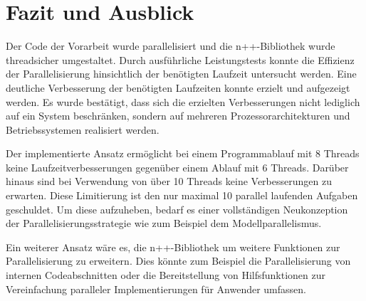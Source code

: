 \chapter{Fazit und Ausblick}
\label{ch:Zusammenfassung}

Der Code der Vorarbeit wurde parallelisiert und die n++-Bibliothek wurde threadsicher umgestaltet. Durch ausführliche Leistungstests konnte die Effizienz der Parallelisierung hinsichtlich der benötigten Laufzeit untersucht werden. Eine deutliche Verbesserung der benötigten Laufzeiten konnte erzielt und aufgezeigt werden. Es wurde bestätigt, dass sich die erzielten Verbesserungen nicht lediglich auf ein System beschränken, sondern auf mehreren Prozessorarchitekturen und Betriebssystemen realisiert werden.

Der implementierte Ansatz ermöglicht bei einem Programmablauf mit 8 Threads keine Laufzeitverbesserungen gegenüber einem Ablauf mit 6 Threads. Darüber hinaus sind bei Verwendung von über 10 Threads keine Verbesserungen zu erwarten. Diese Limitierung ist den nur maximal 10 parallel laufenden Aufgaben geschuldet. Um diese aufzuheben, bedarf es einer vollständigen Neukonzeption der Parallelisierungsstrategie wie zum Beispiel dem Modellparallelismus.

Ein weiterer Ansatz wäre es, die n++-Bibliothek um weitere Funktionen zur Parallelisierung zu erweitern. Dies könnte zum Beispiel die Parallelisierung von internen Codeabschnitten oder die Bereitstellung von Hilfsfunktionen zur Vereinfachung paralleler Implementierungen für Anwender umfassen.